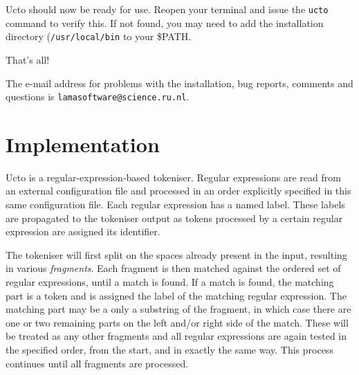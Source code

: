 \documentclass[a4paper,12pt]{report}
\begin{document}
Ucto should now be ready for use. Reopen your terminal and issue the {\tt ucto} command to verify this. If not found, you may need to add the installation directory ({\tt /usr/local/bin} to your \$PATH.

That's all!

The e-mail address for problems with the installation, bug reports,
comments and questions is {\tt lamasoftware@science.ru.nl}.




\chapter{Implementation}
\label{implementation}

Ucto is a regular-expression-based tokeniser. Regular expressions are read from an external configuration file and processed in an order explicitly specified in this same configuration file. Each regular expression has a named label. These labels are propagated to the tokeniser output as tokens processed by a certain regular expression are assigned its identifier.

The tokeniser will first split on the spaces already present in the input, resulting in various \emph{fragments}. Each fragment is then matched against the ordered set of regular expressions, until a match is found. If a match is found, the matching part is a token and is assigned the label of the matching regular expression. The matching part may be a only a substring of the fragment, in which case there are one or two remaining parts on the left and/or right side of the match. These will be treated as any other fragments and all regular expressions are again tested in the specified order, from the start, and in exactly the same way. This process continues until all fragments are processed.
\end{document}
